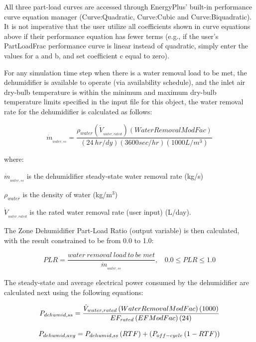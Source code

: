 All three part-load curves are accessed through EnergyPlus' built-in performance curve equation manager (Curve:Quadratic, Curve:Cubic and Curve:Biquadratic). It is not imperative that the user utilize all coefficients shown in curve equations above if their performance equation has fewer terms (e.g., if the user's PartLoadFrac performance curve is linear instead of quadratic, simply enter the values for a and b, and set coefficient c equal to zero).

For any simulation time step when there is a water removal load to be met, the dehumidifier is available to operate (via availability schedule), and the inlet air dry-bulb temperature is within the minimum and maximum dry-bulb temperature limits specified in the input file for this object, the water removal rate for the dehumidifier is calculated as follows:

\begin{equation}
{\dot m_{_{water,ss}}} = \frac{{{\rho_{water}}\left( {{{\dot V}_{_{water,rated}}}} \right)\left( {WaterRemovalModFac} \right)}}{{\left( {24~hr/dy} \right)\left( {3600sec/hr} \right)\left( {1000L/{m^3}} \right)}}
\end{equation}

where:

\({\dot m_{_{water,ss}}}\) is the dehumidifier steady-state water removal rate (kg/s)

\({\rho_{water}}\) is the density of water (kg/m\(^{3}\))

\({\dot V_{_{water,rated}}}\) is the rated water removal rate (user input) (L/day).

The Zone Dehumidifier Part-Load Ratio (output variable) is then calculated, with the result constrained to be from 0.0 to 1.0:

\begin{equation}
PLR = \frac{{water~removal~load~to~be~met}}{{{{\dot m}_{_{water,ss}}}}},~~~~0.0 \leq PLR \leq 1.0
\end{equation}

The steady-state and average electrical power consumed by the dehumidifier are calculated next using the following equations:

\begin{equation}
  P_{dehumid,ss} = \frac{\dot{V}_{water,rated}\left(WaterRemovalModFac\right)\left(1000\right)}{EF_{rated}\left(EFModFac\right)\left(24\right)}
\end{equation}

\begin{equation}
  P_{dehumid,avg} = P_{dehumid,ss} \left(RTF\right) + \left(P_{off-cycle}\left(1 - RTF\right)\right)
\end{equation}

